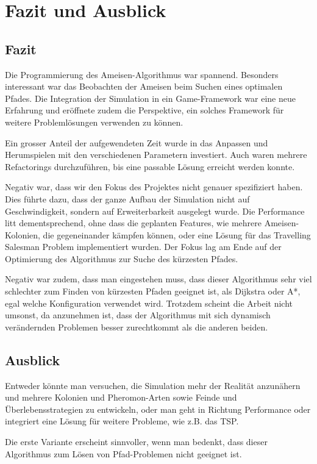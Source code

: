 
\chapter{Fazit und Ausblick}

\section{Fazit}

Die Programmierung des Ameisen-Algorithmus war spannend. Besonders interessant
war das Beobachten der Ameisen beim Suchen eines optimalen Pfades. Die
Integration der Simulation in ein Game-Framework war eine neue Erfahrung und
eröffnete zudem die Perspektive, ein solches Framework für weitere
Problemlösungen verwenden zu können.

Ein grosser Anteil der aufgewendeten Zeit wurde in das Anpassen und Herumspielen
mit den verschiedenen Parametern investiert. Auch waren mehrere Refactorings
durchzuführen, bis eine passable Lösung erreicht werden konnte.

Negativ war, dass wir den Fokus des Projektes nicht genauer spezifiziert haben.
Dies führte dazu, dass der ganze Aufbau der Simulation nicht auf
Geschwindigkeit, sondern auf Erweiterbarkeit ausgelegt wurde. Die Performance
litt dementsprechend, ohne dass die geplanten Features, wie mehrere
Ameisen-Kolonien, die gegeneinander kämpfen können, oder eine Lösung für das
Travelling Salesman Problem implementiert wurden. Der Fokus lag am Ende auf der
Optimierung des Algorithmus zur Suche des kürzesten Pfades.

Negativ war zudem, dass man eingestehen muss, dass dieser Algorithmus sehr viel
schlechter zum Finden von kürzesten Pfaden geeignet ist, als Dijkstra oder A*,
egal welche Konfiguration verwendet wird. Trotzdem scheint die Arbeit nicht
umsonst, da anzunehmen ist, dass der Algorithmus mit sich dynamisch verändernden
Problemen besser zurechtkommt als die anderen beiden.

\section{Ausblick}

Entweder könnte man versuchen, die Simulation mehr der Realität anzunähern und
mehrere Kolonien und Pheromon-Arten sowie Feinde und Überlebensstrategien zu
entwickeln, oder man geht in Richtung Performance oder integriert eine Lösung
für weitere Probleme, wie z.B. das TSP.

Die erste Variante erscheint sinnvoller, wenn man bedenkt, dass dieser
Algorithmus zum Lösen von Pfad-Problemen nicht geeignet ist.


